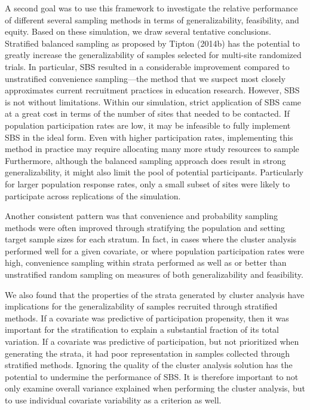 \documentclass[
  english,
  man,floatsintext]{apa6}
\begin{document}
A second goal was to use this framework to investigate the relative performance of different several sampling methods in terms of generalizability, feasibility, and equity. Based on these simulation, we draw several tentative conclusions. Stratified balanced sampling as proposed by Tipton (2014b) has the potential to greatly increase the generalizability of samples selected for multi-site randomized trials. In particular, SBS resulted in a considerable improvement compared to unstratified convenience sampling---the method that we suspect most closely approximates current recruitment practices in education research. However, SBS is not without limitations. Within our simulation, strict application of SBS came at a great cost in terms of the number of sites that needed to be contacted. If population participation rates are low, it may be infeasible to fully implement SBS in the ideal form. Even with higher participation rates, implementing this method in practice may require allocating many more study resources to sample Furthermore, although the balanced sampling approach does result in strong generalizability, it might also limit the pool of potential participants. Particularly for larger population response rates, only a small subset of sites were likely to participate across replications of the simulation.

Another consistent pattern was that convenience and probability sampling methods were often improved through stratifying the population and setting target sample sizes for each stratum. In fact, in cases where the cluster analysis performed well for a given covariate, or where population participation rates were high, convenience sampling within strata performed as well as or better than unstratified random sampling on measures of both generalizability and feasibility.

We also found that the properties of the strata generated by cluster analysis have implications for the generalizability of samples recruited through stratified methods. If a covariate was predictive of participation propensity, then it was important for the stratification to explain a substantial fraction of its total variation. If a covariate was predictive of participation, but not prioritized when generating the strata, it had poor representation in samples collected through stratified methods. Ignoring the quality of the cluster analysis solution has the potential to undermine the performance of SBS. It is therefore important to not only examine overall variance explained when performing the cluster analysis, but to use individual covariate variability as a criterion as well.
\end{document}
